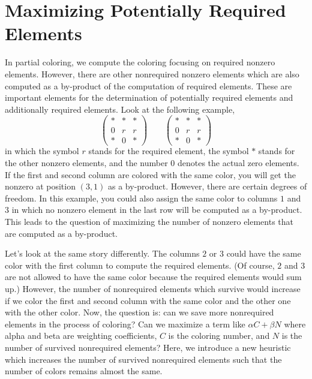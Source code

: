 \documentclass[11pt, twoside,a4paper]{book}
\begin{document}
\section{Maximizing Potentially Required Elements}
\label{s.heuristic}
In partial coloring, we compute the coloring focusing on
required nonzero elements. However, there are other nonrequired nonzero elements
which are also computed as a by-product of the computation of required elements.
These are important elements for the determination of potentially required elements
and additionally required elements. Look at the following example,
\begin{equation}
\left(\begin{array}{rrb}
* & * & *\\
0 & r & r \\
* & 0 & *
\end{array}\right)
\qquad
\left(\begin{array}{rbr}
* & * & *\\
0 & r & r \\
* & 0 & *
\end{array}\right)
\label{twocolorings}
\end{equation}
in which the symbol $r$ stands for the required element,
the symbol \textit{$*$} stands for the other nonzero elements,
and the number $0$ denotes the actual zero elements.
If the first and second column are colored with the same color,
you will get the nonzero at position $(3,1)$ as a by-product.
However, there are certain degrees of freedom. In
this example, you could also assign the same color to columns $1$ and
$3$ in which no nonzero element in the last row will be computed
as a by-product. This leads to the question of maximizing
the number of nonzero elements that are computed as a by-product.

Let's look at the same story differently.
The columns $2$ or $3$ could have the same color with the first column to compute the
required elements. (Of course, $2$ and $3$ are not allowed to have the same color
because the required elements would sum up.)
However, the number of nonrequired elements which survive would increase if
we color the first and second column with the same color and the
other one with the other color. Now, the question is: can we save
more nonrequired elements in the process of coloring? Can we maximize a term like $\alpha C + \beta N$ where alpha and beta are
weighting coefficients, $C$ is the coloring number, and $N$ is the
number of survived nonrequired elements?
Here, we introduce a new heuristic which increases the number of survived nonrequired elements such that the number of colors remains almost the same.
\end{document}
